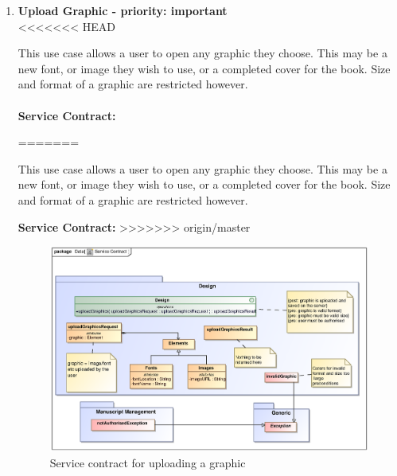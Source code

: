 \begin{enumerate}
\newpage
\item \textbf{Upload Graphic - priority: important}\\
<<<<<<< HEAD
\par{This use case allows a user to open any graphic they choose. This may be a new font, or image they wish to use, or a completed cover for the book. Size and format of a graphic are restricted however.}\\
\\
\textbf{Service Contract:} 

=======
\par{This use case allows a user to open any graphic they choose. This may be a new font, or image they wish to use, or a completed cover for the book. Size and format of a graphic are restricted however.}
\par{\textbf{Service Contract:}}
>>>>>>> origin/master
\begin{figure}[h]
\centering
\includegraphics[scale=0.8,width=400px]{epsImages/Design/uploadGraphicsServiceContract.eps}
\caption{Service contract for uploading a graphic}
\end{figure}
\end{enumerate}
